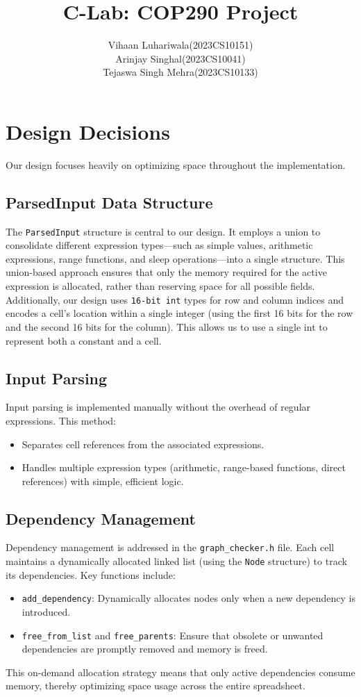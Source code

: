 \documentclass[12pt]{article}
\title{C-Lab: COP290 Project}
\author{Vihaan Luhariwala(2023CS10151) \\ Arinjay Singhal(2023CS10041) \\ Tejaswa Singh Mehra(2023CS10133)}
\date{}
\begin{document}
\maketitle


\section*{Design Decisions}

Our design focuses heavily on optimizing space throughout the implementation. 

\subsection*{ParsedInput Data Structure}

The \texttt{ParsedInput} structure is central to our design. It employs a union to consolidate different expression types—such as simple values, arithmetic expressions, range functions, and sleep operations—into a single structure. This union-based approach ensures that only the memory required for the active expression is allocated, rather than reserving space for all possible fields. Additionally, our design uses \texttt{16-bit int} types for row and column indices and encodes a cell's location within a single integer (using the first 16 bits for the row and the second 16 bits for the column). This allows us to use a single int to represent both a constant and a cell.

\subsection*{Input Parsing}
Input parsing is implemented manually without the overhead of regular expressions. This method:
\begin{itemize}
    \item Separates cell references from the associated expressions.
    \item Handles multiple expression types (arithmetic, range-based functions, direct references) with simple, efficient logic.
\end{itemize}

\subsection*{Dependency Management}
Dependency management is addressed in the \texttt{graph\_checker.h} file. Each cell maintains a dynamically allocated linked list (using the \texttt{Node} structure) to track its dependencies. Key functions include:
\begin{itemize}
    \item \texttt{add\_dependency}: Dynamically allocates nodes only when a new dependency is introduced.
    \item \texttt{free\_from\_list} and \texttt{free\_parents}: Ensure that obsolete or unwanted dependencies are promptly removed and memory is freed.
\end{itemize}
This on-demand allocation strategy means that only active dependencies consume memory, thereby optimizing space usage across the entire spreadsheet.
\end{document}

